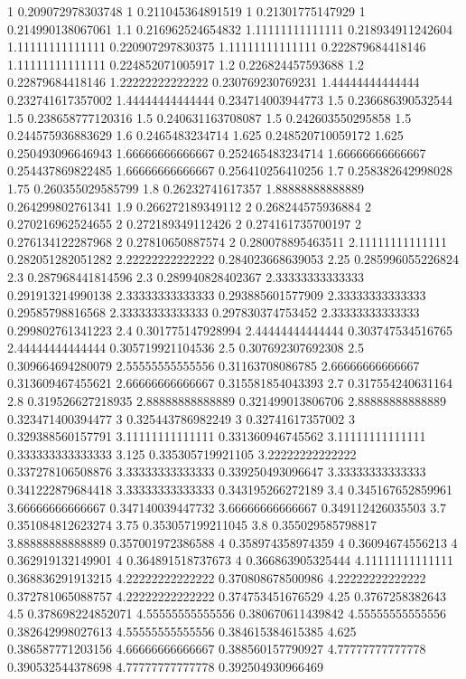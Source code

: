 {1 0.209072978303748
1 0.211045364891519
1 0.21301775147929
1 0.214990138067061
1.1 0.216962524654832
1.11111111111111 0.218934911242604
1.11111111111111 0.220907297830375
1.11111111111111 0.222879684418146
1.11111111111111 0.224852071005917
1.2 0.226824457593688
1.2 0.22879684418146
1.22222222222222 0.230769230769231
1.44444444444444 0.232741617357002
1.44444444444444 0.234714003944773
1.5 0.236686390532544
1.5 0.238658777120316
1.5 0.240631163708087
1.5 0.242603550295858
1.5 0.244575936883629
1.6 0.2465483234714
1.625 0.248520710059172
1.625 0.250493096646943
1.66666666666667 0.252465483234714
1.66666666666667 0.254437869822485
1.66666666666667 0.256410256410256
1.7 0.258382642998028
1.75 0.260355029585799
1.8 0.26232741617357
1.88888888888889 0.264299802761341
1.9 0.266272189349112
2 0.268244575936884
2 0.270216962524655
2 0.272189349112426
2 0.274161735700197
2 0.276134122287968
2 0.27810650887574
2 0.280078895463511
2.11111111111111 0.282051282051282
2.22222222222222 0.284023668639053
2.25 0.285996055226824
2.3 0.287968441814596
2.3 0.289940828402367
2.33333333333333 0.291913214990138
2.33333333333333 0.293885601577909
2.33333333333333 0.29585798816568
2.33333333333333 0.297830374753452
2.33333333333333 0.299802761341223
2.4 0.301775147928994
2.44444444444444 0.303747534516765
2.44444444444444 0.305719921104536
2.5 0.307692307692308
2.5 0.309664694280079
2.55555555555556 0.31163708086785
2.66666666666667 0.313609467455621
2.66666666666667 0.315581854043393
2.7 0.317554240631164
2.8 0.319526627218935
2.88888888888889 0.321499013806706
2.88888888888889 0.323471400394477
3 0.325443786982249
3 0.32741617357002
3 0.329388560157791
3.11111111111111 0.331360946745562
3.11111111111111 0.333333333333333
3.125 0.335305719921105
3.22222222222222 0.337278106508876
3.33333333333333 0.339250493096647
3.33333333333333 0.341222879684418
3.33333333333333 0.343195266272189
3.4 0.345167652859961
3.66666666666667 0.347140039447732
3.66666666666667 0.349112426035503
3.7 0.351084812623274
3.75 0.353057199211045
3.8 0.355029585798817
3.88888888888889 0.357001972386588
4 0.358974358974359
4 0.36094674556213
4 0.362919132149901
4 0.364891518737673
4 0.366863905325444
4.11111111111111 0.368836291913215
4.22222222222222 0.370808678500986
4.22222222222222 0.372781065088757
4.22222222222222 0.374753451676529
4.25 0.3767258382643
4.5 0.378698224852071
4.55555555555556 0.380670611439842
4.55555555555556 0.382642998027613
4.55555555555556 0.384615384615385
4.625 0.386587771203156
4.66666666666667 0.388560157790927
4.77777777777778 0.390532544378698
4.77777777777778 0.392504930966469
}
